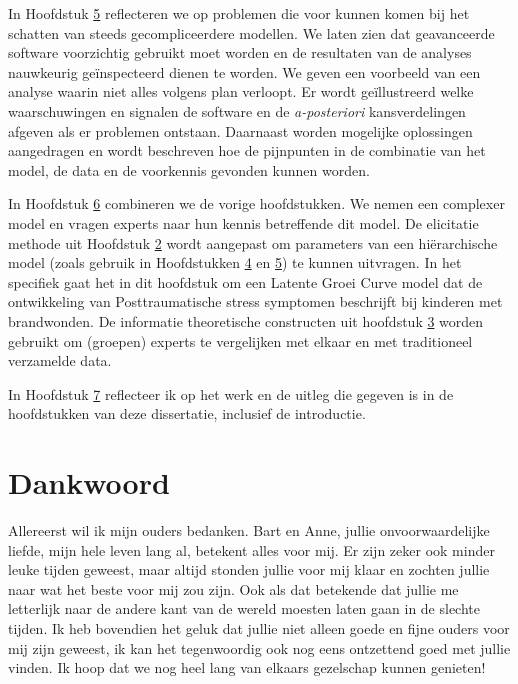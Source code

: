\documentclass[openright,titlepage,12pt,a4paper]{book}
\begin{document}
In Hoofdstuk \protect\hyperlink{Burns}{5} reflecteren we op problemen die voor kunnen komen bij het schatten van steeds gecompliceerdere modellen. We laten zien dat geavanceerde software voorzichtig gebruikt moet worden en de resultaten van de analyses nauwkeurig geïnspecteerd dienen te worden. We geven een voorbeeld van een analyse waarin niet alles volgens plan verloopt. Er wordt geïllustreerd welke waarschuwingen en signalen de software en de \emph{a-posteriori} kansverdelingen afgeven als er problemen ontstaan. Daarnaast worden mogelijke oplossingen aangedragen en wordt beschreven hoe de pijnpunten in de combinatie van het model, de data en de voorkennis gevonden kunnen worden.

In Hoofdstuk \protect\hyperlink{elicitlgm}{6} combineren we de vorige hoofdstukken. We nemen een complexer model en vragen experts naar hun kennis betreffende dit model. De elicitatie methode uit Hoofdstuk \protect\hyperlink{fivestep}{2} wordt aangepast om parameters van een hiërarchische model (zoals gebruik in Hoofdstukken \protect\hyperlink{Hierarchical}{4} en \protect\hyperlink{Burns}{5}) te kunnen uitvragen. In het specifiek gaat het in dit hoofdstuk om een Latente Groei Curve model dat de ontwikkeling van Posttraumatische stress symptomen beschrijft bij kinderen met brandwonden. De informatie theoretische constructen uit hoofdstuk \protect\hyperlink{DAC1}{3} worden gebruikt om (groepen) experts te vergelijken met elkaar en met traditioneel verzamelde data.

In Hoofdstuk \protect\hyperlink{thesisdiscussion}{7} reflecteer ik op het werk en de uitleg die gegeven is in de hoofdstukken van deze dissertatie, inclusief de introductie.

\hypertarget{dankwoord}{%
\chapter*{Dankwoord}\label{dankwoord}}

%

\thispagestyle{empty}

Allereerst wil ik mijn ouders bedanken. Bart en Anne, jullie onvoorwaardelijke liefde, mijn hele leven lang al, betekent alles voor mij. Er zijn zeker ook minder leuke tijden geweest, maar altijd stonden jullie voor mij klaar en zochten jullie naar wat het beste voor mij zou zijn. Ook als dat betekende dat jullie me letterlijk naar de andere kant van de wereld moesten laten gaan in de slechte tijden. Ik heb bovendien het geluk dat jullie niet alleen goede en fijne ouders voor mij zijn geweest, ik kan het tegenwoordig ook nog eens ontzettend goed met jullie vinden. Ik hoop dat we nog heel lang van elkaars gezelschap kunnen genieten!
\end{document}
